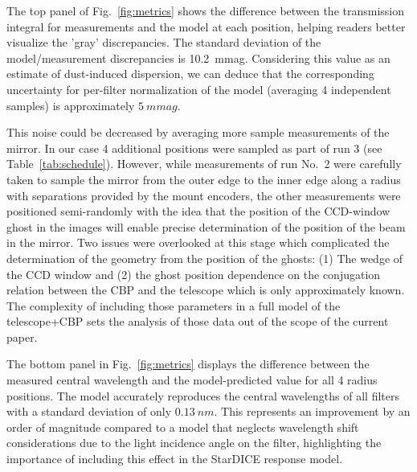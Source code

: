 The top panel of Fig.~\ref{fig:metrics} shows the difference between
the transmission integral for measurements and the model at each
position, helping readers better visualize the 'gray'
discrepancies. The standard deviation of the model/measurement
discrepancies is \SI{10.2}{mmag}. Considering this value as an
estimate of dust-induced dispersion, we can deduce that the
corresponding uncertainty for per-filter normalization of the model
(averaging 4 independent samples) is approximately $\SI{5}{mmag}$.

This noise could be decreased by averaging more sample measurements of
the mirror. In our case 4 additional positions were sampled as part
of run 3 (see Table~\ref{tab:schedule}). However, while measurements of run No.~2 were carefully taken to sample the mirror from the outer
edge to the inner edge along a radius with separations provided by the
mount encoders, the other measurements were positioned semi-randomly
with the idea that the position of the CCD-window ghost in the images
will enable precise determination of the position of the beam in the
mirror. Two issues were overlooked at this stage which complicated the
determination of the geometry from the position of the ghosts: (1) The
wedge of the CCD window and (2) the ghost position dependence on the
conjugation relation between the CBP and the telescope which is only
approximately known. The complexity of including those parameters in a
full model of the telescope+CBP sets the analysis of those data out of
the scope of the current paper.

The bottom panel in Fig.~\ref{fig:metrics} displays the difference
between the measured central wavelength and the model-predicted value
for all 4 radius positions. The model accurately reproduces the
central wavelengths of all filters with a standard deviation of only
$\SI{0.13}{nm}$. This represents an improvement by an order of
magnitude compared to a model that neglects wavelength shift
considerations due to the light incidence angle on the filter, highlighting the importance of including this effect
in the StarDICE response model.

